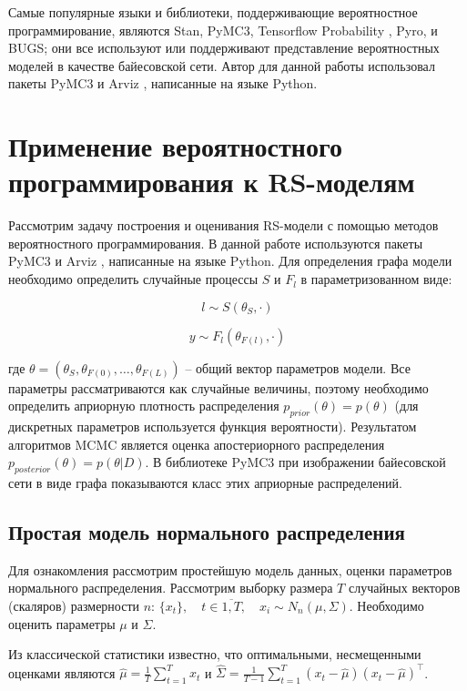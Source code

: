 \documentclass[a4paper,14pt]{extreport}
\begin{document}
Самые популярные языки и библиотеки, поддерживающие вероятностное программирование, являются Stan, PyMC3, Tensorflow Probability \cite{tfp_distributions}, Pyro, и BUGS; они все используют или поддерживают представление вероятностных моделей в качестве байесовской сети. Автор для данной работы использовал пакеты PyMC3 \cite{pymc3_2016} и Arviz \cite{arviz_2019}, написанные на языке Python.


\section{Применение вероятностного программирования к RS-моделям}

Рассмотрим задачу построения и оценивания RS-модели с помощью методов вероятностного программирования. В данной работе используются пакеты PyMC3 \cite{pymc3_2016} и Arviz \cite{arviz_2019}, написанные на языке Python. Для определения графа модели необходимо определить случайные процессы $S$ и $F_l$ в параметризованном виде:

\[
	l \sim S(\theta_S, \cdot)
\]

\[
	y \sim F_l(\theta_{F(l)},\cdot)
\]

где $\theta = (\theta_S, \theta_{F(0)}, \dots, \theta_{F(L)}) $ -- общий вектор параметров модели. Все параметры рассматриваются как случайные величины, поэтому необходимо определить априорную плотность распределения $p_{prior}(\theta) = p(\theta)$ (для дискретных параметров используется функция вероятности). Результатом алгоритмов MCMC является оценка апостериорного распределения $p_{posterior}(\theta) = p(\theta|D)$. В библиотеке PyMC3 при изображении байесовской сети в виде графа показываются класс этих априорные распределений.


\subsection{Простая модель нормального распределения}

Для ознакомления рассмотрим простейшую модель данных, оценки параметров нормального распределения. Рассмотрим выборку размера $T$ случайных векторов (скаляров) размерности $n$: $\{x_t\}, \quad t\in\overline{1,T}, \quad x_i \sim N_n(\mu, \Sigma)$. Необходимо оценить параметры $\mu$ и $\Sigma$. 

Из классической статистики известно, что оптимальными, несмещенными оценками являются $\hat{\mu}=\frac{1}{T}\sum\limits_{t=1}^{T}{x_t}$ и $\hat{\Sigma}=\frac{1}{T-1}\sum\limits_{t=1}^{T}{(x_t-\hat{\mu})(x_t-\hat{\mu})^\top}$. 
\end{document}
